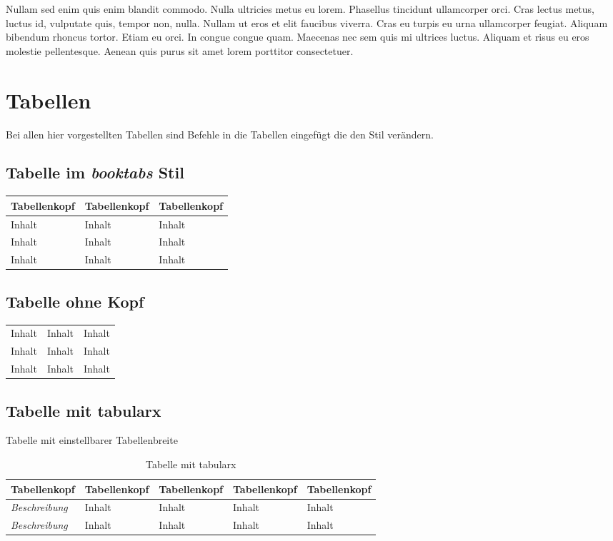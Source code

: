Nullam sed enim quis enim blandit commodo. Nulla ultricies metus eu lorem. Phasellus tincidunt ullamcorper orci. Cras lectus metus, luctus id, vulputate quis, tempor non, nulla. Nullam ut eros et elit faucibus viverra. Cras eu turpis eu urna ullamcorper feugiat. Aliquam bibendum rhoncus tortor. Etiam eu orci. In congue congue quam. Maecenas nec sem quis mi ultrices luctus. Aliquam et risus eu eros molestie pellentesque. Aenean quis purus sit amet lorem porttitor consectetuer.
%

\section{Tabellen}

Bei allen hier vorgestellten Tabellen sind Befehle in die Tabellen eingefügt 
die den Stil verändern.

%
\subsection{Tabelle im \emph{booktabs} Stil}
%
\begin{table}[H]
\tablestyle
\begin{tabular}{lll}
\toprule
   Tabellenkopf &
   Tabellenkopf &
   Tabellenkopf \tabularnewline
\midrule
Inhalt & Inhalt  & Inhalt \tabularnewline
Inhalt & Inhalt  & Inhalt \tabularnewline
Inhalt & Inhalt  & Inhalt \tabularnewline
\bottomrule
\end{tabular}
\end{table}
%


\subsection{Tabelle ohne Kopf}

\begin{table}[H]
\tablestyle
\begin{tabular}{lll}
\hline
Inhalt & Inhalt  & Inhalt \tabularnewline
Inhalt & Inhalt  & Inhalt \tabularnewline
Inhalt & Inhalt  & Inhalt \tabularnewline
\hline
\end{tabular}
\end{table}

%
\subsection{Tabelle mit tabularx}
Tabelle mit einstellbarer Tabellenbreite
\begin{table}[H]
\tablestyle
\begin{tabularx}{\textwidth}{lXXlX}
\toprule
   Tabellenkopf &
   Tabellenkopf &
   Tabellenkopf &
   Tabellenkopf &
   Tabellenkopf \tabularnewline
\midrule
%
   \textit{Beschreibung} & Inhalt & Inhalt & Inhalt & Inhalt \tabularnewline
   \textit{Beschreibung} & Inhalt & Inhalt & Inhalt & Inhalt \tabularnewline
\bottomrule
\end{tabularx}
\caption{Tabelle mit tabularx}
\end{table}
%

